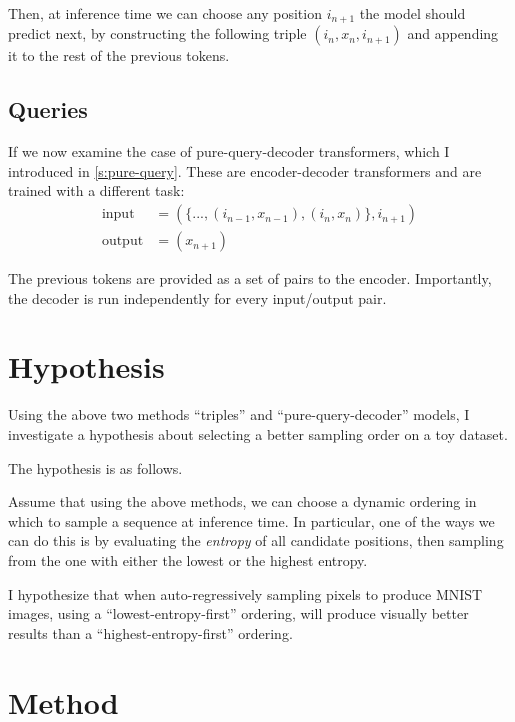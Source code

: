 Then, at inference time we can choose any position $i_{n+1}$ the model should predict next, by constructing the following triple $(i_n, x_n, i_{n+1})$ and appending it to the rest of the previous tokens.

\subsection{Queries}
\label{ss:cross-attn-queries}


If we now examine the case of pure-query-decoder transformers, which I introduced in \cref{s:pure-query}. These are encoder-decoder transformers and are trained with a different task:
\begin{align*}
    \text{input} &= (\{ ..., (i_{n-1}, x_{n-1}), (i_{n}, x_{n}) \}, i_{n+1}) \\
    \text{output} &= (x_{n+1})
\end{align*}

The previous tokens are provided as a set of pairs to the encoder. Importantly, the decoder is run independently for every input/output pair.


\section{Hypothesis}
\label{s:a-o-hypotheses}

Using the above two methods ``triples'' and ``pure-query-decoder'' models, I investigate a hypothesis about selecting a better sampling order on a toy dataset.

The hypothesis is as follows.

Assume that using the above methods, we can choose a dynamic ordering in which to sample a sequence at inference time. In particular, one of the ways we can do this is by evaluating the \textit{entropy} of all candidate positions, then sampling from the one with either the lowest or the highest entropy.

I hypothesize that when auto-regressively sampling pixels to produce MNIST images, using a ``lowest-entropy-first'' ordering, will produce visually better results than a ``highest-entropy-first'' ordering.

\section{Method}

